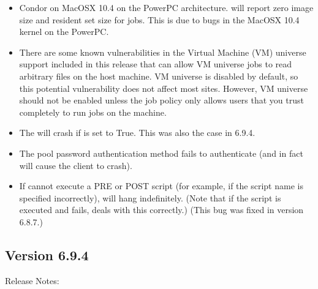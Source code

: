 \begin{itemize}

\item Condor on MacOSX 10.4 on the PowerPC architecture.
will report zero image size and resident set size for jobs. This
is due to bugs in the MacOSX 10.4 kernel on the PowerPC.

\item There are some known vulnerabilities in the Virtual Machine
  (VM) universe support included in this release that can allow VM
  universe jobs to read arbitrary files on the host machine.
  VM universe is disabled by default, so this potential vulnerability
  does not affect most sites.
  However, VM universe should not be enabled unless the job policy
  only allows users that you trust completely to run jobs on the
  machine.

\item The  will crash if  is
set to True.  This was also the case in 6.9.4.

\item The pool password authentication method fails to authenticate
(and in fact will cause the client to crash).

\item If  cannot execute a PRE or POST script
(for example, if the script name is specified incorrectly),
 will hang indefinitely.  (Note that if the 
script is executed and fails,  deals with this
correctly.)  (This bug was fixed in version 6.8.7.)


\end{itemize}


\subsection*{\label{sec:New-6-9-4}Version 6.9.4}

\noindent Release Notes:

